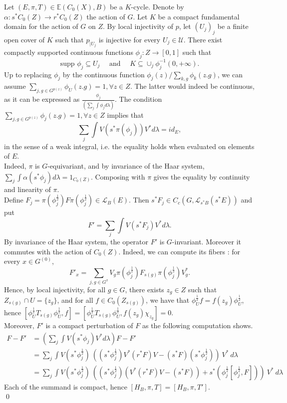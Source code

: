 \begin{dem}
Let $(E,\pi,T)\in \mathbb E(C_0(X),B)$ be a $K$-cycle. Denote by $\alpha : s^* C_0(Z) \rightarrow r^*C_0(Z)$ the action of $G$. Let $K$ be a compact fundamental domain for the action of $G$ on $Z$. By local injectivity of $p$, let $(U_j)_j$ be a finite open cover of $K$ such that $p_{|U_j}$ is injective for every $U_j\in \mathcal U$. There exist compactly supported continuous functions $\phi_j : Z\rightarrow [0,1]$ such that  \[\text{supp }\phi_j \subseteq U_j \quad\text{ and }\quad K\subseteq \cup_{j} \phi_j^{-1}(0,+\infty).\]
Up to replacing $\phi_j$ by the continuous function $\phi_j(z) / \sum_{k,g} \phi_k(z.g)$, we can assume $\sum_{j,g\in G^{p(z)}} \phi_U (z.g) = 1,\forall z\in Z$. The latter would indeed be continuous, as it can be expressed as $\frac{\phi_j} {(\sum_j\int \phi_j d\lambda ) }$. The condition $\sum_{j,g\in G^{p(z)}} \phi_j (z.g) = 1,\forall z\in Z$ implies that 
\[\sum_j \int V(s^*\pi(\phi_j))V^*d\lambda = id_E ,\]
in the sense of a weak integral, i.e. the equality holds when evaluated on elements of $E$.\\
  
Indeed, $\pi$ is $G$-equivariant, and by invariance of the Haar system, $\sum_j\int \alpha(s^*\phi_j)d\lambda = 1_{C_0(Z)}$. Composing with $\pi$ gives the equality by continuity and linearity of $\pi$.\\  

Define $F_j = \pi(\phi_j^\frac{1}{2}) F \pi(\phi_j^\frac{1}{2})\in\mathcal L_B(E)$. Then $s^* F_j\in C_c(G,\mathcal L_{s^* B}(s^* E))$ and put
\[F'= \sum_{j} \int V (s^*F_j) V^* d\lambda.\] 
By invariance of the Haar system, the operator $F'$ is  $G$-invariant. Moreover it commutes with the action of $C_0(Z)$. Indeed, we can compute its fibers : for every $x\in G^{(0)}$,
\[F'_x = \sum_{j, g\in G^x} V_g\pi(\phi_j^{\frac{1}{2}}) F_{s(g)}\pi(\phi_j^{\frac{1}{2}})V_g^*.\] 
Hence, by local injectivity, for all $g\in G$, there exists $z_g\in Z$ such that $Z_{s(g)}\cap U = \{z_g\}$, and for all $f\in C_0(Z_{s(g)})$, we have that $\phi_U^{\frac{1}{2}} f = f(z_g) \phi_U^{\frac{1}{2}}$, hence $[ \phi_U^{\frac{1}{2}} T_{s(g)} \phi_U^{\frac{1}{2}},f ] = [ \phi_U^{\frac{1}{2}} T_{s(g)} \phi_U^{\frac{1}{2}},f(z_g) \chi_{z_g} ]=0 $.\\

Moreover, $F'$ is a compact perturbation of $F$ as the following computation shows.\\
\[\begin{array}{rl}
F -F' 	& = (\sum_{j} \int V (s^* \phi_j) V^*d\lambda)F -F' \\
		& = \sum_{j}\int V (s^*\phi_j^{\frac{1}{2}}) \ 
\left( (s^*\phi_j^\frac{1}{2}) V^* (r^*F) V- (s^*F)(s^*\phi_j^\frac{1}{2}) \right) \ V^* \ d\lambda\\
		& = \sum_{j} \int V (s^*\phi_j^{\frac{1}{2}}) \ 
			\left( (s^*\phi_j^\frac{1}{2}) (V^* (r^*F)V - (s^*F)) + s^*(\phi_j^\frac{1}{2} [\phi_j^\frac{1}{2},F] )\right) \ 
				V^* \ d\lambda	  	
\end{array}\]
Each of the summand is compact, hence $[H_B, \pi,T]=[H_B,\pi,T']$.\\ 
\qed
\end{dem}

